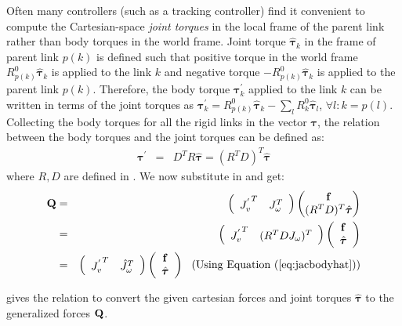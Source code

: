Often many controllers (such as a tracking controller) find it convenient to compute the Cartesian-space \emph{joint torques} in the local frame of the parent link rather than body torques in the world frame. Joint torque $\hat{\bm{\tau}}_k$ in the frame of parent link $p(k)$ is defined such that positive torque in the world frame $R^0_{p(k)}\hat{\bm{\tau}}_k$ is applied to the link $k$ and negative torque $-R^0_{p(k)}\hat{\bm{\tau}}_k$ is applied to the parent link $p(k)$. Therefore, the body torque $\bm{\tau}^{'}_k$ applied to the link $k$ can be written in terms of the joint torques as $\bm{\tau}^{'}_k = R^0_{p(k)}\hat{\bm{\tau}}_k - \sum_l R^0_{k} \hat{\bm{\tau}}_l$, $\forall l:k=p(l)$. Collecting the body torques for all the rigid links in the vector $\bm{\tau}$, the relation between the body torques and the joint torques can be defined as:
\begin{eqnarray}
\label{eq:torquesbodyhat}
\bm{\tau}^{'} & = & D^T R \hat{\bm{\tau}} = (R^T D)^T \hat{\bm{\tau}}
\end{eqnarray}
where $R, D$ are defined in . We now substitute  in  and get:
\begin{eqnarray}
\label{eq:torques_cart2gen}
\nonumber
\vc{Q} & = & 
\left (
\begin{array}{cc}
{J^{'}_{v}}^T & J_\omega^T
\end{array}
\right )
\begin{pmatrix}
\vc{f} \\
(R^T D)^T \hat{\bm{\tau}}
\end{pmatrix}
 \\
\nonumber
& = & 
\left (
\begin{array}{cc}
{J^{'}_{v}}^T & (R^T D J_\omega)^T
\end{array}
\right )
\left (
\begin{array}{c}
\vc{f} \\
\hat{\bm{\tau}}
\end{array}
\right )
\\
& = & 
\left (
\begin{array}{cc}
{J^{'}_{v}}^T & \hat{J}_\omega^T
\end{array}
\right )
\left (
\begin{array}{c}
\vc{f} \\
\hat{\bm{\tau}}
\end{array}
\right )  \mbox{\ \ (Using \eqnref{jacbodyhat})}
\end{eqnarray}

 gives the relation to convert the given cartesian forces  and joint torques $\hat{\bm{\tau}}$ to the generalized forces $\mathbf{Q}$. 

